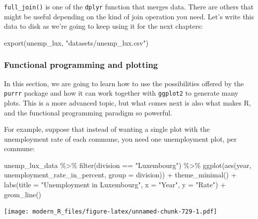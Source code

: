 \documentclass[
]{article}
\newenvironment{Shaded}{\begin{snugshade}}{\end{snugshade}}
\newcommand{\AttributeTok}[1]{\textcolor[rgb]{0.77,0.63,0.00}{#1}}
\newcommand{\FunctionTok}[1]{\textcolor[rgb]{0.00,0.00,0.00}{#1}}
\newcommand{\NormalTok}[1]{#1}
\newcommand{\SpecialCharTok}[1]{\textcolor[rgb]{0.00,0.00,0.00}{#1}}
\newcommand{\StringTok}[1]{\textcolor[rgb]{0.31,0.60,0.02}{#1}}
\begin{document}
\texttt{full\_join()} is one of the \texttt{dplyr} function that merges data. There are others that might be
useful depending on the kind of join operation you need. Let's write this data to disk as we're
going to keep using it for the next chapters:

\begin{Shaded}
\begin{Highlighting}[]
\FunctionTok{export}\NormalTok{(unemp\_lux, }\StringTok{"datasets/unemp\_lux.csv"}\NormalTok{)}
\end{Highlighting}
\end{Shaded}

\hypertarget{functional-programming-and-plotting}{%
\subsubsection{Functional programming and plotting}\label{functional-programming-and-plotting}}

In this section, we are going to learn how to use the possibilities offered by the \texttt{purrr} package
and how it can work together with \texttt{ggplot2} to generate many plots. This is a more advanced topic,
but what comes next is also what makes R, and the functional programming paradigm so powerful.

For example, suppose that instead of wanting a single plot with the unemployment rate of each
commune, you need one unemployment plot, per commune:

\begin{Shaded}
\begin{Highlighting}[]
\NormalTok{unemp\_lux\_data }\SpecialCharTok{\%\textgreater{}\%}
  \FunctionTok{filter}\NormalTok{(division }\SpecialCharTok{==} \StringTok{"Luxembourg"}\NormalTok{) }\SpecialCharTok{\%\textgreater{}\%}
  \FunctionTok{ggplot}\NormalTok{(}\FunctionTok{aes}\NormalTok{(year, unemployment\_rate\_in\_percent, }\AttributeTok{group =}\NormalTok{ division)) }\SpecialCharTok{+}
  \FunctionTok{theme\_minimal}\NormalTok{() }\SpecialCharTok{+}
  \FunctionTok{labs}\NormalTok{(}\AttributeTok{title =} \StringTok{"Unemployment in Luxembourg"}\NormalTok{, }\AttributeTok{x =} \StringTok{"Year"}\NormalTok{, }\AttributeTok{y =} \StringTok{"Rate"}\NormalTok{) }\SpecialCharTok{+}
  \FunctionTok{geom\_line}\NormalTok{()}
\end{Highlighting}
\end{Shaded}

\texttt{[image: modern\_R\_files/figure-latex/unnamed-chunk-729-1.pdf]}
\end{document}
